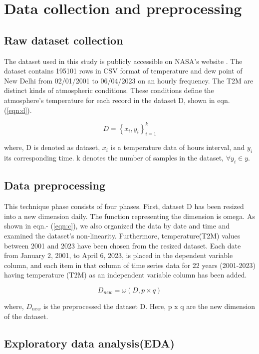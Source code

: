 \section{Data collection and preprocessing}
\subsection{Raw dataset collection}
The dataset used in this study is publicly accessible on NASA's website . The dataset contains 195101 rows in CSV format of temperature and dew point of New Delhi from 02/01/2001 to 06/04/2023 on an hourly frequency. The T2M are distinct kinds of atmospheric conditions. These conditions define the atmosphere's temperature for each record in the dataset D, shown in eqn. (\ref{eqn:d}).

\begin{equation}
\label{eqn:d}
D=\left \{ x_i, y_i \right \}_{i=1}^{k}
\end{equation}

where, D is denoted as dataset, \(x_i\) is a temperature data of hours interval, and \(y_i\) its corresponding time. k denotes the number of samples in the dataset, $\forall y_i \in y $.

\subsection{Data preprocessing}
This technique phase consists of four phases. First, dataset D has been resized into a new dimension daily. The function representing the dimension is omega. As shown in eqn.- (\ref{eqn:c}), we also organized the data by date and time and examined the dataset's non-linearity. Furthermore, temperature(T2M) values between 2001 and 2023 have been chosen from the resized dataset. Each date from January 2, 2001, to April 6, 2023, is placed in the dependent variable column, and each item in that column of time series data for 22 years (2001-2023) having temperature (T2M) as an independent variable column has been added.

\begin{equation}
\label{eqn:c}
D_{new}=\omega \left ( D, p \times q \right )
\end{equation}

where, \(D_{new}\) is the preprocessed the dataset D. Here, p x q are the new dimension of the dataset.
\subsection{Exploratory data analysis(EDA)}

